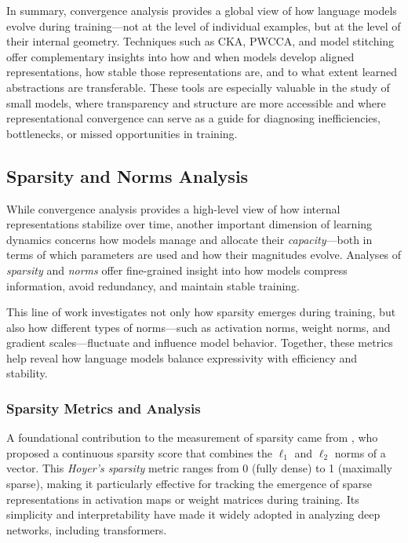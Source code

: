 In summary, convergence analysis provides a global view of how language models evolve during training---not at the level of individual examples, but at the level of their internal geometry. Techniques such as CKA, PWCCA, and model stitching offer complementary insights into how and when models develop aligned representations, how stable those representations are, and to what extent learned abstractions are transferable. These tools are especially valuable in the study of small models, where transparency and structure are more accessible and where representational convergence can serve as a guide for diagnosing inefficiencies, bottlenecks, or missed opportunities in training.

\subsection{Sparsity and Norms Analysis}

While convergence analysis provides a high-level view of how internal representations stabilize over time, another important dimension of learning dynamics concerns how models manage and allocate their \textit{capacity}—both in terms of which parameters are used and how their magnitudes evolve. Analyses of \textit{sparsity} and \textit{norms} offer fine-grained insight into how models compress information, avoid redundancy, and maintain stable training.

This line of work investigates not only how sparsity emerges during training, but also how different types of norms—such as activation norms, weight norms, and gradient scales—fluctuate and influence model behavior. Together, these metrics help reveal how language models balance expressivity with efficiency and stability.

\subsubsection{Sparsity Metrics and Analysis}

A foundational contribution to the measurement of sparsity came from \citet{hoyer2004sparsity}, who proposed a continuous sparsity score that combines the \( \ell_1 \) and \( \ell_2 \) norms of a vector. This \textit{Hoyer's sparsity} metric ranges from 0 (fully dense) to 1 (maximally sparse), making it particularly effective for tracking the emergence of sparse representations in activation maps or weight matrices during training. Its simplicity and interpretability have made it widely adopted in analyzing deep networks, including transformers.

